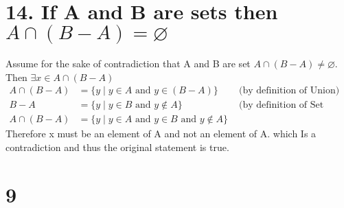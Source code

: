 \documentclass{article}
\newcommand{\nullset}{\varnothing}
\begin{document}
	\section*{14. If A and B are sets then $A \cap (B-A)= \nullset$}
	Assume for the sake of contradiction that A and B are set $A \cap (B-A) \neq \nullset$. Then $\exists x \in A \cap (B-A)$
	\begin{align*}
		A \cap (B-A) &= \{y \mid y \in A  \text{ and } y \in(B-A)\} &\text{ (by definition of Union)} \\
		B-A          &= \{y \mid y \in B \text{ and } y \not\in A\} &\text{ (by definition of Set Subtraction)} \\
		A \cap (B-A) &= \{y \mid y \in A  \text{ and } y \in B \text{ and } y \not\in A\} 
	\end{align*}
	Therefore x must be an element of A and not an element of A. which Is a contradiction and thus the original statement is true.
	
	\section*{9}
\end{document}
